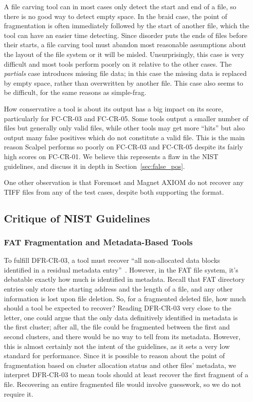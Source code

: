 A file carving tool can in most cases only detect the start and end of a file, so there is no good way to detect empty space. 
In the braid case, the point of fragmentation is often immediately followed by the start of another file, which the tool can have an easier time detecting.
Since disorder puts the ends of files before their starts, a file carving tool must abandon most reasonable assumptions about the layout of the file system or it will be misled.
Unsurprisingly, this case is very difficult and most tools perform poorly on it relative to the other cases.
The \emph{partials} case introduces missing file data; in this case the missing data is replaced by empty space, rather than overwritten by another file.
This case also seems to be difficult, for the same reasons as simple-frag.

How conservative a tool is about its output has a big impact on its score, particularly for FC-CR-03 and FC-CR-05.
Some tools output a smaller number of files but generally only valid files, while other tools may get more ``hits'' but also output many false positives which do not constitute a valid file.
This is the main reason Scalpel performs so poorly on FC-CR-03 and FC-CR-05 despite its fairly high scores on FC-CR-01.
We believe this represents a flaw in the NIST guidelines, and discuss it in depth in Section~\ref{sec:false_pos}.

One other observation is that Foremost and Magnet AXIOM do not recover any TIFF files from any of the test cases, despite both supporting the format.


\subsection{Critique of NIST Guidelines}
\subsubsection{FAT Fragmentation and Metadata-Based Tools}

To fulfill DFR-CR-03, a tool must recover ``all non-allocated data blocks identified in a residual metadata entry''~\cite{meta:dfr:standards}.
However, in the FAT file system, it's debatable exactly how much is identified in metadata.
Recall that FAT directory entries only store the starting address and the length of a file, and any other information is lost upon file deletion.
So, for a fragmented deleted file, how much should a tool be expected to recover?
Reading DFR-CR-03 very close to the letter, one could argue that the only data definitively identified in metadata is the first cluster; after all, the file could be fragmented between the first and second clusters, and there would be no way to tell from its metadata.
However, this is almost certainly not the intent of the guidelines, as it sets a very low standard for performance.
Since it is possible to reason about the point of fragmentation based on cluster allocation status and other files' metadata, we interpret DFR-CR-03 to mean tools should at least recover the first fragment of a file.
Recovering an entire fragmented file would involve guesswork, so we do not require it.

